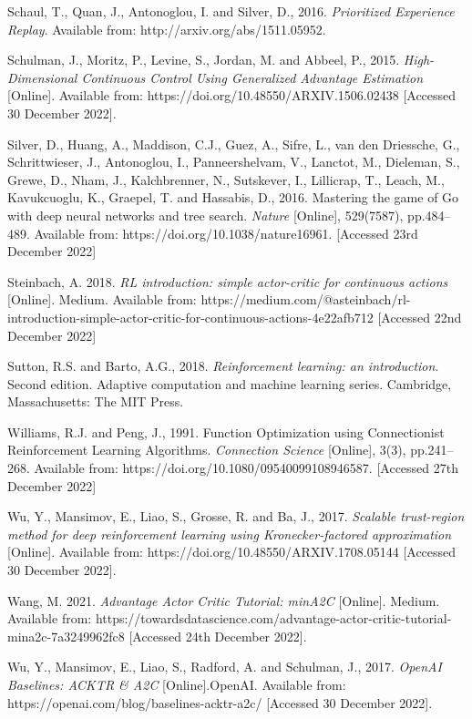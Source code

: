 \documentclass{article}
\begin{document}
Schaul, T., Quan, J., Antonoglou, I. and Silver, D., 2016. \emph{Prioritized Experience Replay}. Available from: http://arxiv.org/abs/1511.05952.

Schulman, J., Moritz, P., Levine, S., Jordan, M. and Abbeel, P., 2015. \emph{High-Dimensional Continuous Control Using Generalized Advantage Estimation}  [Online]. Available from: https://doi.org/10.48550/ARXIV.1506.02438 [Accessed 30 December 2022].

Silver, D., Huang, A., Maddison, C.J., Guez, A., Sifre, L., van den Driessche, G., Schrittwieser, J., Antonoglou, I., Panneershelvam, V., Lanctot, M., Dieleman, S., Grewe, D., Nham, J., Kalchbrenner, N., Sutskever, I., Lillicrap, T., Leach, M., Kavukcuoglu, K., Graepel, T. and Hassabis, D., 2016. Mastering the game of Go with deep neural networks and tree search. \emph{Nature} [Online], 529(7587), pp.484–489. Available from: https://doi.org/10.1038/nature16961. [Accessed 23rd December 2022]

Steinbach, A. 2018. \emph{RL introduction: simple actor-critic for continuous actions} [Online]. Medium. Available from: https://medium.com/@asteinbach/rl-introduction-simple-actor-critic-for-continuous-actions-4e22afb712 [Accessed 22nd December 2022]

Sutton, R.S. and Barto, A.G., 2018. \emph{Reinforcement learning: an introduction}. Second edition. Adaptive computation and machine learning series. Cambridge, Massachusetts: The MIT Press.

Williams, R.J. and Peng, J., 1991. Function Optimization using Connectionist Reinforcement Learning Algorithms. \emph{Connection Science} [Online], 3(3), pp.241–268. Available from: https://doi.org/10.1080/09540099108946587. [Accessed 27th December 2022]

Wu, Y., Mansimov, E., Liao, S., Grosse, R. and Ba, J., 2017. \emph{Scalable trust-region method for deep reinforcement learning using Kronecker-factored approximation} [Online]. Available from: https://doi.org/10.48550/ARXIV.1708.05144 [Accessed 30 December 2022].

Wang, M. 2021. \emph{Advantage Actor Critic Tutorial: minA2C} [Online]. Medium. Available from: https://towardsdatascience.com/advantage-actor-critic-tutorial-mina2c-7a3249962fc8 [Accessed 24th December 2022].

Wu, Y., Mansimov, E., Liao, S., Radford, A. and Schulman, J., 2017. \emph{OpenAI Baselines: ACKTR \& A2C} [Online].OpenAI. Available from: https://openai.com/blog/baselines-acktr-a2c/ [Accessed 30 December 2022].
\end{document}
